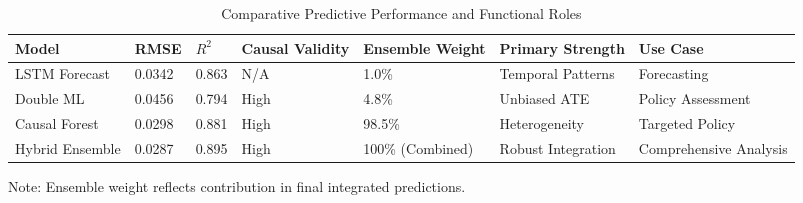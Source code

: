 \begin{table}[htbp]
  \centering
  \caption{Comparative Predictive Performance and Functional Roles}
  \label{tab:model_performance_comparison}
  \small
  \begin{tabular}{lllllll}
    \toprule
    Model & RMSE & $R^2$ & Causal Validity & Ensemble Weight & Primary Strength & Use Case \\
    \midrule
    LSTM Forecast & 0.0342 & 0.863 & N/A & 1.0\% & Temporal Patterns & Forecasting \\
    Double ML & 0.0456 & 0.794 & High & 4.8\% & Unbiased ATE & Policy Assessment \\
    Causal Forest & 0.0298 & 0.881 & High & 98.5\% & Heterogeneity & Targeted Policy \\
    Hybrid Ensemble & 0.0287 & 0.895 & High & 100\% (Combined) & Robust Integration & Comprehensive Analysis \\
    \bottomrule
  \end{tabular}
  \vspace{0.5em}
  {\footnotesize Note: Ensemble weight reflects contribution in final integrated predictions.}
\end{table}
